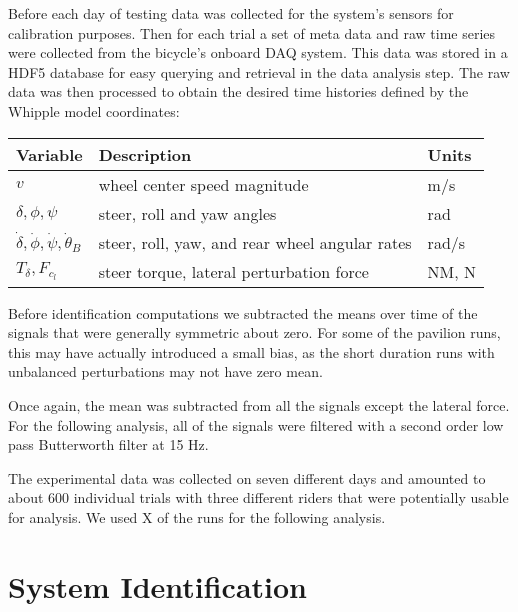 \documentclass[a4paper]{article}
\begin{document}

Before each day of testing data was collected for the system's sensors for
calibration purposes. Then for each trial a set of meta data and raw time
series were collected from the bicycle's onboard DAQ system. This data was
stored in a HDF5 database for easy querying and retrieval in the data analysis
step. The raw data was then processed to obtain the desired time histories
defined by the Whipple model coordinates:

\begin{table}
  \begin{tabular}{lll}
    Variable                                            & Description                                    & Units \\
    \hline
    $v$                                                 & wheel center speed magnitude                   & m/s \\
    $\delta,\phi,\psi$                                  & steer, roll and yaw angles                     & rad \\
    $\dot{\delta},\dot{\phi},\dot{\psi},\dot{\theta}_B$ & steer, roll, yaw, and rear wheel angular rates & rad/s \\
    $T_\delta,F_{c_l}$                                  & steer torque, lateral perturbation force       & NM, N
  \end{tabular}
\end{table}

Before identification computations we subtracted the means over time of the
signals that were generally symmetric about zero. For some of the pavilion
runs, this may have actually introduced a small bias, as the short duration
runs with unbalanced perturbations may not have zero mean.

 Once again, the mean was
subtracted from all the signals except the lateral force.
 For
the following analysis, all of the signals were filtered with a second order
low pass Butterworth filter at 15 Hz. 


The experimental data was collected on seven different days and amounted to
about 600 individual trials with three different riders that were potentially
usable for analysis. We used X of the runs for the following analysis.

\section{System Identification}
\end{document}
